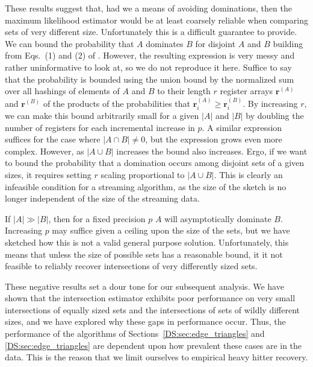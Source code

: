\documentclass[10]{report}
\begin{document}
These results suggest that, had we a means of avoiding dominations, then the maximum likelihood estimator would be at least coarsely reliable when comparing sets of very different size. 
Unfortunately this is a difficult guarantee to provide.
We can bound the probability that $A$ dominates $B$ for disjoint $A$ and $B$ building from Eqs.~(1) and (2) of \cite{ertl2017new}.
However, the resulting expression is very messy and rather uninformative to look at, so we do not reproduce it here.
Suffice to say that the probability is bounded using the union bound by the normalized sum over all hashings of elements of $A$ and $B$ to their length $r$ register arrays $\mathbf{r}^{(A)}$ and $\mathbf{r}^{(B)}$ of the products of the probabilities that $\mathbf{r}^{(A)}_i \geq \mathbf{r}^{(B)}_i$.
By increasing $r$, we can make this bound arbitrarily small for a given $|A|$ and $|B|$ by doubling the number of registers for each incremental increase in $p$.
A similar expression suffices for the case where $|A \cap B| \neq 0$, but the expression grows even more complex.
However, as $|A \cup B|$ increases the bound also increases.
Ergo, if we want to bound the probability that a domination occurs among disjoint sets of a given sizes, it requires setting $r$ scaling proportional to $|A \cup B|$.
This is clearly an infeasible condition for a streaming algorithm, as the size of the sketch is no longer independent of the size of the streaming data.

If $|A| \gg |B|$, then for a fixed precision $p$ $A$ will asymptotically dominate $B$.
Increasing $p$ may suffice given a ceiling upon the size of the sets, but we have sketched how this is not a valid general purpose solution. 
Unfortunately, this means that unless the size of possible sets has a reasonable bound, it it not feasible to reliably recover intersections of very differently sized sets.

These negative results set a dour tone for our subsequent analysis. 
We have shown that the intersection estimator exhibits poor performance on very small intersections of equally sized sets and the intersections of sets of wildly different sizes, and we have explored why these gaps in performance occur.
Thus, the performance of the algorithms of Sections~\ref{DS:sec:edge_triangles} and \ref{DS:sec:edge_triangles} are dependent upon how prevalent these cases are in the data.
This is the reason that we limit ourselves to empirical heavy hitter recovery.

\end{document}
